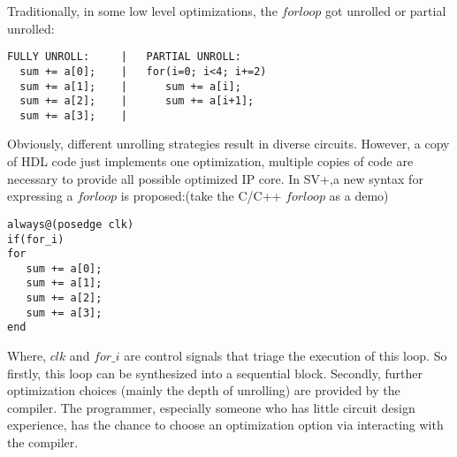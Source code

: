 Traditionally, in some low level optimizations, the $forloop$ got unrolled or partial unrolled:
\begin{verbatim}
FULLY UNROLL:     |   PARTIAL UNROLL:
  sum += a[0];    |   for(i=0; i<4; i+=2)
  sum += a[1];    |      sum += a[i];
  sum += a[2];    |      sum += a[i+1];
  sum += a[3];    |
\end{verbatim}

Obviously, different unrolling strategies result in diverse circuits.
However, a copy of HDL code just implements one optimization, multiple copies of code are necessary to provide all possible optimized IP core. In SV+,a new syntax for expressing a $forloop$ is proposed:(take the C/C++ $forloop$ as a demo)
\begin{verbatim}
always@(posedge clk)
if(for_i)
for
   sum += a[0];
   sum += a[1];
   sum += a[2];
   sum += a[3];
end
\end{verbatim}
Where, $clk$ and $for\_i$ are control signals that triage the execution of this loop. So firstly, this loop can be synthesized into a sequential block. Secondly, further optimization choices (mainly the depth of unrolling) are provided by the compiler. The programmer, especially someone who has little circuit design experience, has the chance to choose an optimization option via interacting with the compiler.

